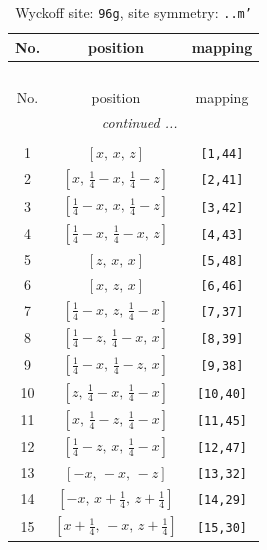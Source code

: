 \documentclass[fleqn,8pt]{jsarticle}
\begin{document}
\begin{longtable}{ccc}
\caption{Wyckoff site: {\tt 96g}, site symmetry: {\tt ..m'}}
 \\
 \hline \hline
No. & position & mapping \\ \hline \endfirsthead

\multicolumn{2}{l}{\tablename\ \thetable{}} \\
 \hline \hline
No. & position & mapping \\ \hline \endhead

 \hline \hline
\multicolumn{2}{r}{\footnotesize\it continued ...} \\ \endfoot

 \hline \hline
\multicolumn{2}{r}{} \\ \endlastfoot

1 & $\left[ x,\, x,\, z \right]$ & {\tt [1,44]} \\ \hline
2 & $\left[ x,\, \frac{1}{4} - x,\, \frac{1}{4} - z \right]$ & {\tt [2,41]} \\ \hline
3 & $\left[ \frac{1}{4} - x,\, x,\, \frac{1}{4} - z \right]$ & {\tt [3,42]} \\ \hline
4 & $\left[ \frac{1}{4} - x,\, \frac{1}{4} - x,\, z \right]$ & {\tt [4,43]} \\ \hline
5 & $\left[ z,\, x,\, x \right]$ & {\tt [5,48]} \\ \hline
6 & $\left[ x,\, z,\, x \right]$ & {\tt [6,46]} \\ \hline
7 & $\left[ \frac{1}{4} - x,\, z,\, \frac{1}{4} - x \right]$ & {\tt [7,37]} \\ \hline
8 & $\left[ \frac{1}{4} - z,\, \frac{1}{4} - x,\, x \right]$ & {\tt [8,39]} \\ \hline
9 & $\left[ \frac{1}{4} - x,\, \frac{1}{4} - z,\, x \right]$ & {\tt [9,38]} \\ \hline
10 & $\left[ z,\, \frac{1}{4} - x,\, \frac{1}{4} - x \right]$ & {\tt [10,40]} \\ \hline
11 & $\left[ x,\, \frac{1}{4} - z,\, \frac{1}{4} - x \right]$ & {\tt [11,45]} \\ \hline
12 & $\left[ \frac{1}{4} - z,\, x,\, \frac{1}{4} - x \right]$ & {\tt [12,47]} \\ \hline
13 & $\left[ - x,\, - x,\, - z \right]$ & {\tt [13,32]} \\ \hline
14 & $\left[ - x,\, x + \frac{1}{4},\, z + \frac{1}{4} \right]$ & {\tt [14,29]} \\ \hline
15 & $\left[ x + \frac{1}{4},\, - x,\, z + \frac{1}{4} \right]$ & {\tt [15,30]} \\ \hline

\end{longtable}
\end{document}

